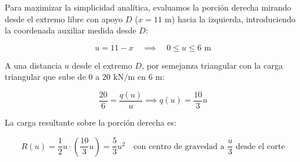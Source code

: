 


Para maximizar la simplicidad analítica, evaluamos la porción derecha mirando desde el extremo libre con apoyo $D$ ($x = 11\text{ m}$) hacia la izquierda, introduciendo la coordenada auxiliar medida desde $D$:

\begin{equation}

    u = 11 - x \quad \implies \quad 0 \le u \le 6\text{ m}

\end{equation}

A una distancia $u$ desde el extremo $D$, por semejanza triangular con la carga triangular que sube de $0$ a $20\text{ kN/m}$ en $6\text{ m}$:

\begin{equation}

    \frac{20}{6} = \frac{q(u)}{u} \implies q(u) = \frac{10}{3}u

\end{equation}

La carga resultante sobre la porción derecha es:

\begin{equation}

    R(u) = \frac{1}{2} u \cdot \left(\frac{10}{3}u\right) = \frac{5}{3}u^2 \quad \text{con centro de gravedad a } \frac{u}{3} \text{ desde el corte}

\end{equation}



